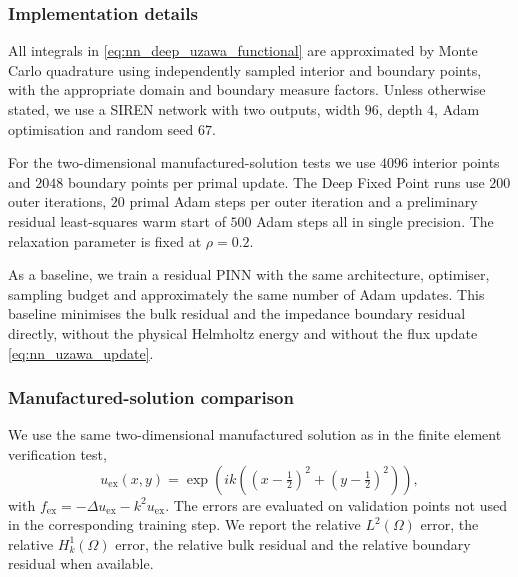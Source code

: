 \documentclass[twoside,11pt]{article}
\newcommand{\qp}[1]{\ensuremath{\!\left({#1}\right)}}
\begin{document}
{\subsubsection*{Implementation details}

All integrals in \eqref{eq:nn_deep_uzawa_functional} are approximated by Monte Carlo quadrature using independently sampled interior and boundary points, with the appropriate domain and boundary measure factors. Unless otherwise stated, we use a SIREN network with two outputs, width $96$, depth $4$, Adam optimisation and random seed $67$.

For the two-dimensional manufactured-solution tests we use $4096$ interior points and $2048$ boundary points per primal update. The Deep Fixed Point runs use $200$ outer iterations, $20$ primal Adam steps per outer iteration and a preliminary residual least-squares warm start of $500$ Adam steps all in single precision. The relaxation parameter is fixed at $\rho=0.2$.

As a baseline, we train a residual PINN with the same architecture, optimiser, sampling budget and approximately the same number of Adam updates. This baseline minimises the bulk residual and the impedance boundary residual directly, without the physical Helmholtz energy and without the flux update \eqref{eq:nn_uzawa_update}.

\subsubsection*{Manufactured-solution comparison}

We use the same two-dimensional manufactured solution as in the finite element verification test,
\[
u_{\mathrm{ex}}(x,y)
=
\exp\qp{
ik\qp{(x-\tfrac12)^2+(y-\tfrac12)^2}
},
\]
with $f_{\mathrm{ex}}=-\Delta u_{\mathrm{ex}}-k^2u_{\mathrm{ex}}$. The errors are evaluated on validation points not used in the corresponding training step. We report the relative $L^2(\Omega)$ error, the relative $H^1_k(\Omega)$ error, the relative bulk residual and the relative boundary residual when available.

}
\end{document}

